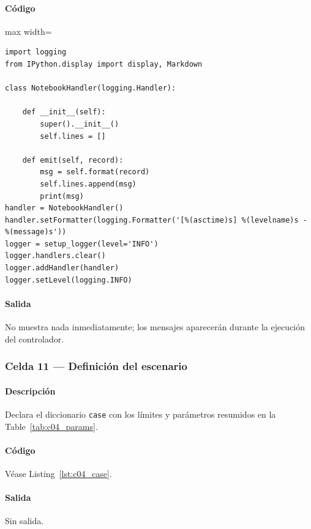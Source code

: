 \paragraph{Código}
\begin{listing}[H]
\caption{Celda 9: configuración de logs interactivos}
\label{lst:c04_cell09}
\begin{adjustbox}{max width=\textwidth}
\begin{minipage}{\textwidth}
\begin{verbatim}
import logging
from IPython.display import display, Markdown

class NotebookHandler(logging.Handler):

    def __init__(self):
        super().__init__()
        self.lines = []

    def emit(self, record):
        msg = self.format(record)
        self.lines.append(msg)
        print(msg)
handler = NotebookHandler()
handler.setFormatter(logging.Formatter('[%(asctime)s] %(levelname)s - %(message)s'))
logger = setup_logger(level='INFO')
logger.handlers.clear()
logger.addHandler(handler)
logger.setLevel(logging.INFO)
\end{verbatim}
\end{minipage}
\end{adjustbox}
\end{listing}
\paragraph{Salida} No muestra nada inmediatamente; los mensajes aparecerán durante la ejecución del controlador.

\subsubsection*{Celda 11 — Definición del escenario}
\paragraph{Descripción} Declara el diccionario \texttt{case} con los límites y parámetros resumidos en la Table~\ref{tab:c04_params}. %
\paragraph{Código} Véase Listing~\ref{lst:c04_case}.
\paragraph{Salida} Sin salida.

